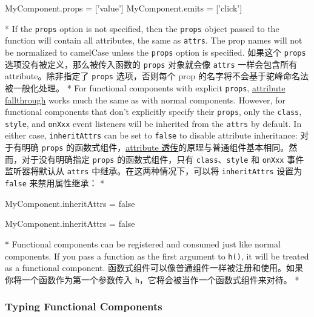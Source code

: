 \begin{paracol}{2}
\begin{codeJs}
MyComponent.props = ['value']
MyComponent.emits = ['click']
\end{codeJs}
\switchcolumn[0]*%
If the \texttt{props} option is not specified, then the \texttt{props}
object passed to the function will contain all attributes, the same as
\texttt{attrs}. The prop names will not be normalized to camelCase
unless the \texttt{props} option is specified.
\switchcolumn
如果这个 \texttt{props} 选项没有被定义，那么被传入函数的 \texttt{props}
对象就会像 \texttt{attrs} 一样会包含所有 attribute。除非指定了
\texttt{props} 选项，否则每个 prop
的名字将不会基于驼峰命名法被一般化处理。
\switchcolumn[0]*%
For functional components with explicit \texttt{props},
\href{https://vuejs.org/guide/components/attrs.html}{attribute
fallthrough} works much the same as with normal components. However, for
functional components that don't explicitly specify their
\texttt{props}, only the \texttt{class}, \texttt{style}, and
\texttt{onXxx} event listeners will be inherited from the \texttt{attrs}
by default. In either case, \texttt{inheritAttrs} can be set to
\texttt{false} to disable attribute inheritance:
\switchcolumn
对于有明确 \texttt{props}
的函数式组件，\href{https://cn.vuejs.org/guide/components/attrs.html}{attribute
透传}的原理与普通组件基本相同。然而，对于没有明确指定 \texttt{props}
的函数式组件，只有 \texttt{class}、\texttt{style} 和 \texttt{onXxx}
事件监听器将默认从 \texttt{attrs} 中继承。在这两种情况下，可以将
\texttt{inheritAttrs} 设置为 \texttt{false} 来禁用属性继承：
\switchcolumn[0]*%
\begin{codeJs}
MyComponent.inheritAttrs = false
\end{codeJs}
\switchcolumn
\begin{codeJs}
MyComponent.inheritAttrs = false
\end{codeJs}
\switchcolumn[0]*%
Functional components can be registered and consumed just like normal
components. If you pass a function as the first argument to
\texttt{h()}, it will be treated as a functional component.
\switchcolumn
函数式组件可以像普通组件一样被注册和使用。如果你将一个函数作为第一个参数传入
\texttt{h}，它将会被当作一个函数式组件来对待。
\switchcolumn[0]*%
\subsubsection{Typing Functional Components}
\switchcolumn

\end{paracol}
